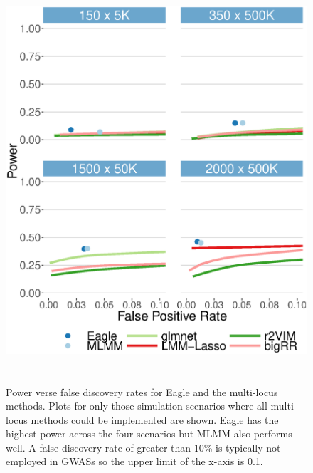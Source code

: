 \documentclass{article}
\begin{document}
\begin{figure}
\caption{Power verse false discovery rates for Eagle and the multi-locus methods. Plots for only those simulation 
scenarios where all multi-locus methods could be implemented are shown.  Eagle has the highest power across the four 
scenarios but MLMM also performs well. A false discovery rate of greater than 10\% is typically not employed in GWASs so the 
upper limit of the x-axis is 0.1.}
\label{supfigpowermultiple}
\begin{center}
\includegraphics[width=15cm, height=15cm]{power1main.eps}
\end{center}

\end{figure}
\end{document}
